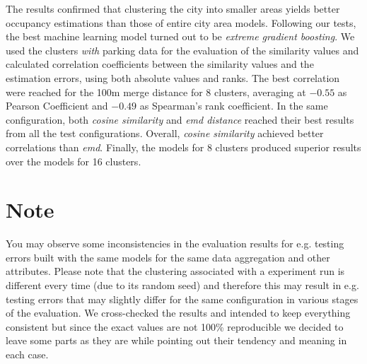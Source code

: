 The results confirmed that clustering the city into smaller areas yields better occupancy estimations than those of entire city area models.
Following our tests, the best machine learning model turned out to be \textit{extreme gradient boosting}.
We used the clusters \textit{with} parking data for the evaluation of the similarity values and calculated correlation coefficients between the similarity values and the estimation errors, using both absolute values and ranks.
The best correlation were reached for the 100m merge distance for 8 clusters, averaging at $-0.55$ as Pearson Coefficient and $-0.49$ as Spearman's rank coefficient.
In the same configuration, both \textit{cosine similarity} and \textit{emd distance} reached their best results from all the test configurations.
Overall, \textit{cosine similarity} achieved better correlations than \textit{emd}.
Finally, the models for 8 clusters produced superior results over the models for 16 clusters. 


\section{Note}
You may observe some inconsistencies in the evaluation results for e.g. testing errors built with the same models for the same data aggregation and other attributes. Please note that the clustering associated with a experiment run is different every time (due to its random seed) and therefore this may result in e.g. testing errors that may slightly differ for the same configuration in various stages of the evaluation. We cross-checked the results and intended to keep everything consistent but since the exact values are not 100\% reproducible we decided to leave some parts as they are while pointing out their tendency and meaning in each case.


%
	
